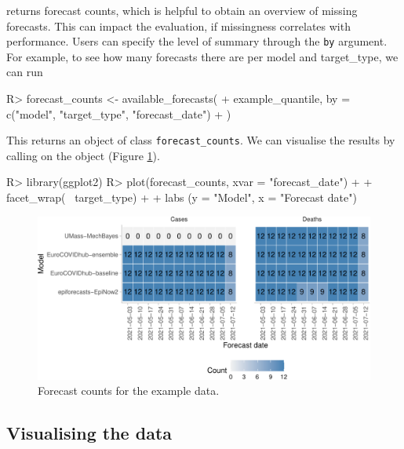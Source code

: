 \documentclass[
]{jss}
\begin{document}
 returns forecast counts, which is helpful
to obtain an overview of missing forecasts. This can impact the
evaluation, if missingness correlates with performance. Users can
specify the level of summary through the \texttt{by} argument. For
example, to see how many forecasts there are per model and target\_type,
we can run

\begin{CodeChunk}
\begin{CodeInput}
R> forecast_counts <- available_forecasts(
+   example_quantile, by = c("model", "target_type", "forecast_date")
+ )
\end{CodeInput}
\end{CodeChunk}

This returns an object of class \texttt{forecast\_counts}. We can
visualise the results by calling  on the object (Figure
\ref{fig:plot-forecast-counts}).

\begin{CodeChunk}
\begin{CodeInput}
R> library(ggplot2)
R> plot(forecast_counts, xvar = "forecast_date") + 
+   facet_wrap(~ target_type) + 
+   labs (y = "Model", x = "Forecast date")
\end{CodeInput}
\begin{figure}[!h]

{\centering \includegraphics[width=1\linewidth]{manuscript_files/figure-latex/plot-forecast-counts-1} 

}

\caption[Forecast counts for the example data]{Forecast counts for the example data.}\label{fig:plot-forecast-counts}
\end{figure}
\end{CodeChunk}

\subsection{Visualising the data}\label{visualising-the-data}
\end{document}
